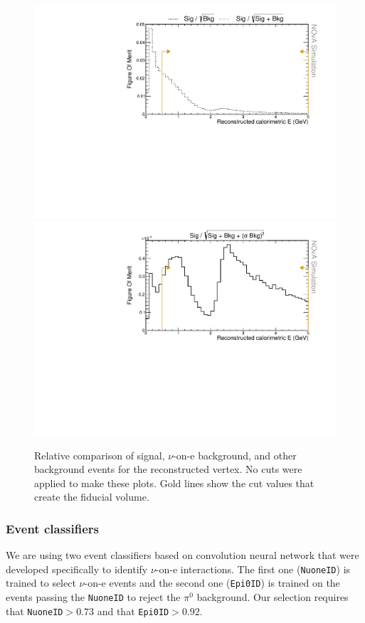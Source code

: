 \begin{figure}[hbtp]
\centering
\includegraphics[width=.9\textwidth]{Plots/NuMMEventSelection/NuMM_N1Cut_calE_Stat.pdf}
\includegraphics[width=.9\textwidth]{Plots/NuMMEventSelection/NuMM_N1Cut_calE_Syst.pdf}
\caption{Relative comparison of signal, $\nu$-on-e background, and other background events for the reconstructed vertex. No cuts were applied to make these plots. Gold lines show the cut values that create the fiducial volume.}
\label{fig:SingleShowerCuts2}
\end{figure}

\subsubsection*{Event classifiers}

We are using two event classifiers based on convolution neural network that were developed specifically to identify $\nu$-on-e interactions. The first one (\texttt{NuoneID}) is trained to select $\nu$-on-e events and the second one (\texttt{Epi0ID}) is trained on the events passing the \texttt{NuoneID} to reject the $\pi^0$ background. Our selection requires that \texttt{NuoneID}$>0.73$ and that \texttt{Epi0ID}$>0.92$.

